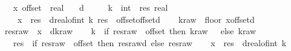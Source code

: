 \begin{isabellebody}
\ \ \ x\ offset\ {\isacharcolon}{\kern0pt}{\isacharcolon}{\kern0pt}\ real\isanewline
\ \ \ {\isachardoublequoteopen}d\ {\isachargreater}{\kern0pt}\ {}{\isachardoublequoteclose}\isanewline
\ \ \ k\ {\isacharcolon}{\kern0pt}{\isacharcolon}{\kern0pt}\ int\ \ res\ {\isacharcolon}{\kern0pt}{\isacharcolon}{\kern0pt}real\ \isanewline
\ \ \ \ {\isachardoublequoteopen}x\ {\isacharequal}{\kern0pt}\ res\ {\isacharplus}{\kern0pt}\ d{\isacharasterisk}{\kern0pt}real{\isacharunderscore}{\kern0pt}of{\isacharunderscore}{\kern0pt}int\ k{\isachardoublequoteclose}\ {\isachardoublequoteopen}res\ {\isasymin}\ {\isacharbraceleft}{\kern0pt}offset{\isacharless}{\kern0pt}{\isachardot}{\kern0pt}{\isachardot}{\kern0pt}offset{\isacharplus}{\kern0pt}d{\isacharbraceright}{\kern0pt}{\isachardoublequoteclose}\isanewline
%
\isadelimproof
%
\endisadelimproof
%
\isatagproof
{}\isamarkupfalse%
\isanewline
\ \ \isamarkupfalse%
\ {\isacharquery}{\kern0pt}kraw\ {\isacharequal}{\kern0pt}\ {\isachardoublequoteopen}floor\ {\isacharparenleft}{\kern0pt}{\isacharparenleft}{\kern0pt}x{\isacharminus}{\kern0pt}offset{\isacharparenright}{\kern0pt}{\isacharslash}{\kern0pt}d{\isacharparenright}{\kern0pt}{\isachardoublequoteclose}\isanewline
\ \ \isamarkupfalse%
\ {\isacharquery}{\kern0pt}resraw\ {\isacharequal}{\kern0pt}\ {\isachardoublequoteopen}x\ {\isacharminus}{\kern0pt}\ d{\isacharasterisk}{\kern0pt}{\isacharquery}{\kern0pt}kraw{\isachardoublequoteclose}\isanewline
\ \ \isamarkupfalse%
\ {\isacharquery}{\kern0pt}k\ {\isacharequal}{\kern0pt}\ {\isachardoublequoteopen}if\ {\isacharquery}{\kern0pt}resraw\ {\isacharequal}{\kern0pt}\ offset\ then\ {\isacharquery}{\kern0pt}kraw\ {\isacharminus}{\kern0pt}\ {}\ else\ {\isacharquery}{\kern0pt}kraw{\isachardoublequoteclose}\isanewline
\ \ \ {\isacharquery}{\kern0pt}res\ {\isacharequal}{\kern0pt}\ {\isachardoublequoteopen}if\ {\isacharquery}{\kern0pt}resraw\ {\isacharequal}{\kern0pt}\ offset\ then\ {\isacharquery}{\kern0pt}resraw{\isacharplus}{\kern0pt}d\ else\ {\isacharquery}{\kern0pt}resraw{\isachardoublequoteclose}\isanewline
\ \ \isamarkupfalse%
\ {\isachardoublequoteopen}x\ {\isacharequal}{\kern0pt}\ {\isacharquery}{\kern0pt}res\ {\isacharplus}{\kern0pt}\ d{\isacharasterisk}{\kern0pt}real{\isacharunderscore}{\kern0pt}of{\isacharunderscore}{\kern0pt}int\ {\isacharquery}{\kern0pt}k{\isachardoublequoteclose}\isanewline

\end{isabellebody}

